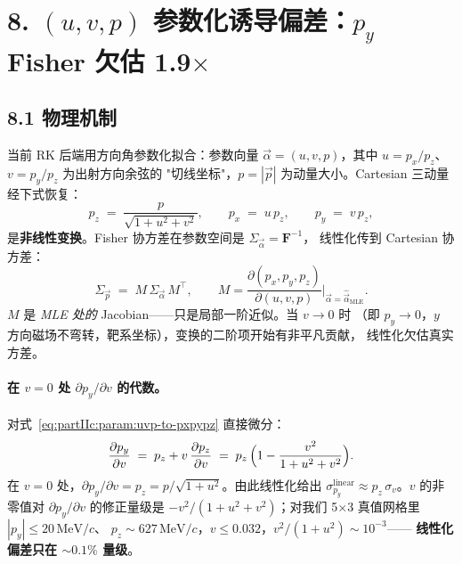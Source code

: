 \section{8. \texorpdfstring{$(u,v,p)$}{(u,v,p)} 参数化诱导偏差：\texorpdfstring{$p_y$}{p\_y} Fisher 欠估 1.9\texorpdfstring{$\times$}{x}}
\label{sec:partIIc:budget:parametrization}

\subsection*{8.1 物理机制}

当前 RK 后端用方向角参数化拟合：参数向量
$\vec\alpha = (u, v, p)$，其中 $u = p_x/p_z$、$v = p_y/p_z$ 为出射方向余弦的
"切线坐标"，$p = |\vec p|$ 为动量大小。Cartesian 三动量经下式恢复：
\begin{equation}
  p_z \;=\; \frac{p}{\sqrt{1 + u^2 + v^2}},\qquad
  p_x \;=\; u\,p_z,\qquad
  p_y \;=\; v\,p_z,
  \label{eq:partIIc:param:uvp-to-pxpypz}
\end{equation}
是\textbf{非线性变换}。Fisher 协方差在参数空间是 $\Sigma_{\vec\alpha} = \mathbf F^{-1}$，
线性化传到 Cartesian 协方差：
\begin{equation}
  \Sigma_{\vec p} \;=\; M\,\Sigma_{\vec\alpha}\,M^\top,
  \qquad M = \frac{\partial(p_x, p_y, p_z)}{\partial(u, v, p)}\bigg|_{\vec\alpha = \hat{\vec\alpha}_\mathrm{MLE}}.
  \label{eq:partIIc:param:linearize}
\end{equation}
$M$ 是 \emph{MLE 处的} Jacobian——只是局部一阶近似。当 $v \to 0$ 时
（即 $p_y \to 0$，$y$ 方向磁场不弯转，靶系坐标），变换的二阶项开始有非平凡贡献，
线性化欠估真实方差。

\paragraph{在 $v=0$ 处 $\partial p_y/\partial v$ 的代数。}
对式~\eqref{eq:partIIc:param:uvp-to-pxpypz} 直接微分：
\begin{equation}
  \frac{\partial p_y}{\partial v}
  \;=\; p_z + v\,\frac{\partial p_z}{\partial v}
  \;=\; p_z\,\Bigl(1 - \frac{v^2}{1+u^2+v^2}\Bigr).
  \label{eq:partIIc:param:dpy-dv}
\end{equation}
在 $v=0$ 处，$\partial p_y/\partial v = p_z = p/\sqrt{1+u^2}$。由此线性化给出
$\sigma_{p_y}^\mathrm{linear} \approx p_z\,\sigma_v$。$v$ 的非零值对 $\partial p_y/\partial v$
的修正量级是 $-v^2/(1+u^2+v^2)$；对我们 5$\times$3 真值网格里 $|p_y|\le 20\,\mathrm{MeV}/c$、
$p_z\sim 627\,\mathrm{MeV}/c$，$v \le 0.032$，$v^2/(1+u^2)\sim 10^{-3}$——
\textbf{线性化偏差只在 $\sim 0.1\%$ 量级}。

